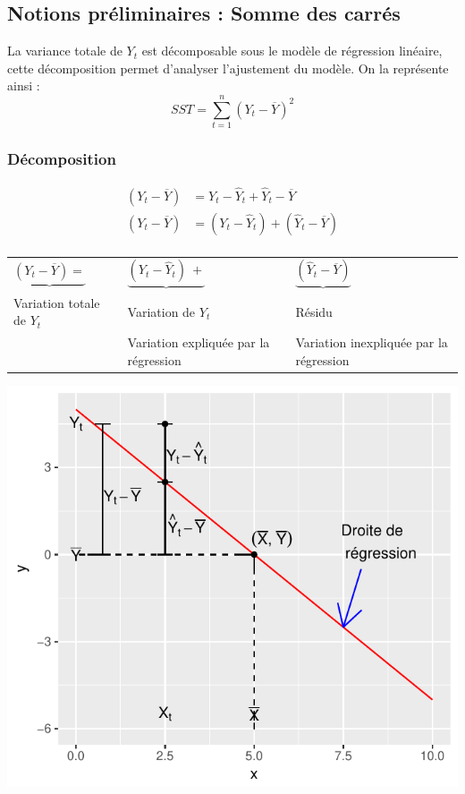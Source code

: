 \documentclass[11pt,french]{report}
\begin{document}
\subsection{Notions préliminaires : Somme des carrés}
La variance totale de $Y_t$ est décomposable sous le modèle de régression linéaire, cette décomposition permet d'analyser l'ajustement du modèle. On la représente ainsi :
$$
SST = \displaystyle\sum_{t=1}^n(Y_t-\overline{Y})^2
$$
\bigskip
\subsubsection*{Décomposition}
\begin{align*}
(Y_t - \overline{Y}) &= Y_t - \hat{Y}_t + \hat{Y}_t - \overline{Y} \\
(Y_t - \overline{Y}) &= (Y_t - \hat{Y}_t) + (\hat{Y}_t - \overline{Y}) \\
\end{align*}

\begin{center}
\begin{tabularx}{\textwidth}{XXX}
$\underbrace{(Y_t - \overline{Y}) =} $ & $\underbrace{(Y_t - \hat{Y}_t) \  +}$ & $\underbrace{(\hat{Y}_t - \overline{Y})}$ \\
Variation totale de $Y_t$ & Variation de $Y_t$ & Résidu \\
& Variation expliquée \newline par la régression & Variation inexpliquée \newline par la régression \\
\end{tabularx}
\end{center}

\includegraphics{notes_de_cours-013}
\end{document}
